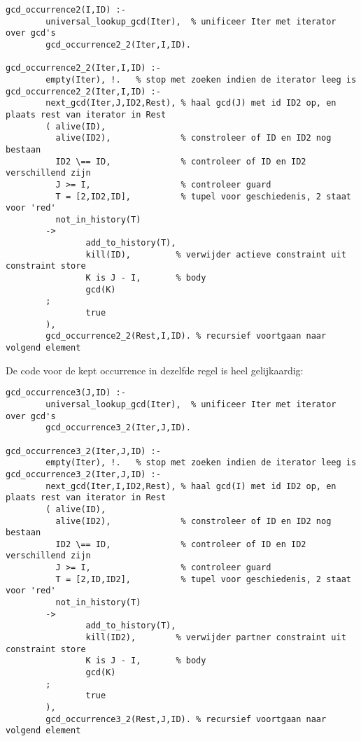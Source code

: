 {\scriptsize \begin{Verbatim}[frame=single]
gcd_occurrence2(I,ID) :-
        universal_lookup_gcd(Iter),  % unificeer Iter met iterator over gcd's
        gcd_occurrence2_2(Iter,I,ID).

gcd_occurrence2_2(Iter,I,ID) :-
        empty(Iter), !.   % stop met zoeken indien de iterator leeg is
gcd_occurrence2_2(Iter,I,ID) :-
        next_gcd(Iter,J,ID2,Rest), % haal gcd(J) met id ID2 op, en plaats rest van iterator in Rest
        ( alive(ID),
          alive(ID2),              % constroleer of ID en ID2 nog bestaan
          ID2 \== ID,              % controleer of ID en ID2 verschillend zijn
          J >= I,                  % controleer guard
          T = [2,ID2,ID],          % tupel voor geschiedenis, 2 staat voor 'red'
          not_in_history(T)
        ->
                add_to_history(T),
                kill(ID),         % verwijder actieve constraint uit constraint store
                K is J - I,       % body
                gcd(K)
        ;
                true
        ),
        gcd_occurrence2_2(Rest,I,ID). % recursief voortgaan naar volgend element
\end{Verbatim}
}

De code voor de kept occurrence in dezelfde regel is heel gelijkaardig:

{\scriptsize \begin{Verbatim}[frame=single]
gcd_occurrence3(J,ID) :-
        universal_lookup_gcd(Iter),  % unificeer Iter met iterator over gcd's
        gcd_occurrence3_2(Iter,J,ID).

gcd_occurrence3_2(Iter,J,ID) :-
        empty(Iter), !.   % stop met zoeken indien de iterator leeg is
gcd_occurrence3_2(Iter,J,ID) :-
        next_gcd(Iter,I,ID2,Rest), % haal gcd(I) met id ID2 op, en plaats rest van iterator in Rest
        ( alive(ID),
          alive(ID2),              % constroleer of ID en ID2 nog bestaan
          ID2 \== ID,              % controleer of ID en ID2 verschillend zijn
          J >= I,                  % controleer guard
          T = [2,ID,ID2],          % tupel voor geschiedenis, 2 staat voor 'red'
          not_in_history(T)
        ->
                add_to_history(T),
                kill(ID2),        % verwijder partner constraint uit constraint store
                K is J - I,       % body
                gcd(K)
        ;
                true
        ),
        gcd_occurrence3_2(Rest,J,ID). % recursief voortgaan naar volgend element
\end{Verbatim}
}

